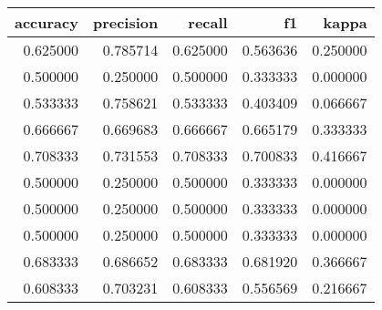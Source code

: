 \begin{tabular}{rrrrr}
\toprule
accuracy & precision & recall & f1 & kappa \\
\midrule
0.625000 & 0.785714 & 0.625000 & 0.563636 & 0.250000 \\
0.500000 & 0.250000 & 0.500000 & 0.333333 & 0.000000 \\
0.533333 & 0.758621 & 0.533333 & 0.403409 & 0.066667 \\
0.666667 & 0.669683 & 0.666667 & 0.665179 & 0.333333 \\
0.708333 & 0.731553 & 0.708333 & 0.700833 & 0.416667 \\
0.500000 & 0.250000 & 0.500000 & 0.333333 & 0.000000 \\
0.500000 & 0.250000 & 0.500000 & 0.333333 & 0.000000 \\
0.500000 & 0.250000 & 0.500000 & 0.333333 & 0.000000 \\
0.683333 & 0.686652 & 0.683333 & 0.681920 & 0.366667 \\
0.608333 & 0.703231 & 0.608333 & 0.556569 & 0.216667 \\
\bottomrule
\end{tabular}
